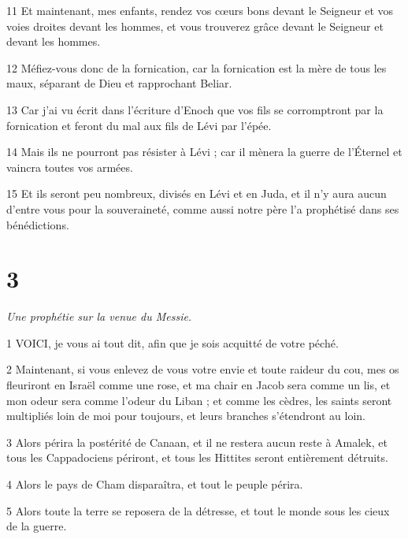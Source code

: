 \par 11 Et maintenant, mes enfants, rendez vos cœurs bons devant le Seigneur et vos voies droites devant les hommes, et vous trouverez grâce devant le Seigneur et devant les hommes.

\par 12 Méfiez-vous donc de la fornication, car la fornication est la mère de tous les maux, séparant de Dieu et rapprochant Beliar.

\par 13 Car j'ai vu écrit dans l'écriture d'Enoch que vos fils se corromptront par la fornication et feront du mal aux fils de Lévi par l'épée.

\par 14 Mais ils ne pourront pas résister à Lévi ; car il mènera la guerre de l'Éternel et vaincra toutes vos armées.

\par 15 Et ils seront peu nombreux, divisés en Lévi et en Juda, et il n'y aura aucun d'entre vous pour la souveraineté, comme aussi notre père l'a prophétisé dans ses bénédictions.

\chapter{3}

\par \textit{Une prophétie sur la venue du Messie.}

\par 1 VOICI, je vous ai tout dit, afin que je sois acquitté de votre péché.

\par 2 Maintenant, si vous enlevez de vous votre envie et toute raideur du cou, mes os fleuriront en Israël comme une rose, et ma chair en Jacob sera comme un lis, et mon odeur sera comme l'odeur du Liban ; et comme les cèdres, les saints seront multipliés loin de moi pour toujours, et leurs branches s'étendront au loin.

\par 3 Alors périra la postérité de Canaan, et il ne restera aucun reste à Amalek, et tous les Cappadociens périront, et tous les Hittites seront entièrement détruits.

\par 4 Alors le pays de Cham disparaîtra, et tout le peuple périra.

\par 5 Alors toute la terre se reposera de la détresse, et tout le monde sous les cieux de la guerre.

